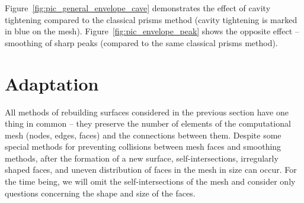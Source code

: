 \documentclass[
11pt,
tightenlines,
twoside,
onecolumn,
nofloats,
nobibnotes,
nofootinbib,
superscriptaddress,
noshowpacs,
centertags]
{revtex4-2}
\begin{document}
Figure~\ref{fig:pic_general_envelope_cave} demonstrates the effect
of cavity tightening compared to the classical prisms method (cavity
tightening is marked in blue on the mesh).
Figure~\ref{fig:pic_envelope_peak} shows the opposite effect --
smoothing of sharp peaks (compared to the same classical prisms
method).


\section{Adaptation}

All methods of rebuilding surfaces considered in the previous section have one thing in common -- they preserve the number of elements of the computational mesh (nodes, edges, faces) and the connections between them.
Despite some special methods for preventing collisions between mesh faces and smoothing methods, after the formation of a new surface, self-intersections, irregularly shaped faces, and uneven distribution of faces in the mesh in size can occur.
For the time being, we will omit the self-intersections of the mesh and consider only questions concerning the shape and size of the faces.
\end{document}
